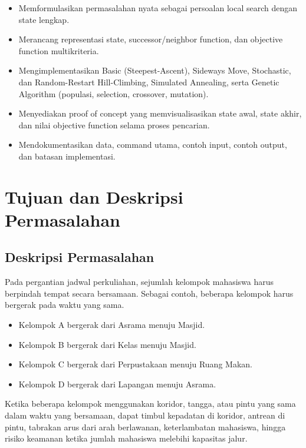 \documentclass[11pt,a4paper]{article}
\begin{document}
\begin{itemize}[leftmargin=2em,itemsep=0.1em]
  \item Memformulasikan permasalahan nyata sebagai persoalan local search dengan state lengkap.
  \item Merancang representasi state, successor/neighbor function, dan objective function multikriteria.
  \item Mengimplementasikan Basic (Steepest-Ascent), Sideways Move, Stochastic, dan Random-Restart Hill-Climbing, Simulated Annealing, serta Genetic Algorithm (populasi, selection, crossover, mutation).
  \item Menyediakan proof of concept yang memvisualisasikan state awal, state akhir, dan nilai objective function selama proses pencarian.
  \item Mendokumentasikan data, command utama, contoh input, contoh output, dan batasan implementasi.
\end{itemize}

\section{Tujuan dan Deskripsi Permasalahan}

\subsection{Deskripsi Permasalahan}

Pada pergantian jadwal perkuliahan, sejumlah kelompok mahasiswa harus berpindah tempat secara bersamaan. Sebagai contoh, beberapa kelompok harus bergerak pada waktu yang sama.

\begin{itemize}[leftmargin=2em,itemsep=0.1em]
  \item Kelompok A bergerak dari Asrama menuju Masjid.
  \item Kelompok B bergerak dari Kelas menuju Masjid.
  \item Kelompok C bergerak dari Perpustakaan menuju Ruang Makan.
  \item Kelompok D bergerak dari Lapangan menuju Asrama.
\end{itemize}

Ketika beberapa kelompok menggunakan koridor, tangga, atau pintu yang sama dalam waktu yang bersamaan, dapat timbul kepadatan di koridor, antrean di pintu, tabrakan arus dari arah berlawanan, keterlambatan mahasiswa, hingga risiko keamanan ketika jumlah mahasiswa melebihi kapasitas jalur.
\end{document}
